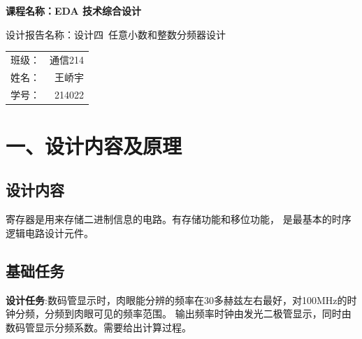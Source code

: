 \documentclass{article}
\newcommand{\fourhao}{\fontsize{14pt}{\baselineskip}\selectfont} %
\newcommand{\xiaosihao}{\fontsize{12pt}{\baselineskip}\selectfont} %
\begin{document}
\begin{titlepage}
    \centering
    \vspace*{2cm}

    \Huge
    \textbf{课程名称：EDA 技术综合设计}

    \vspace{2cm}

    \LARGE
    设计报告名称：设计四\ 任意小数和整数分频器设计

    \vspace{4cm}

    \centering
    \Large
    \begin{tabular}{rl}
        班级： & 通信214    \\
        姓名： & \ 王峤宇   \\
        学号： & \ 214022
    \end{tabular}

    \vfill

    \vspace{1cm}
\end{titlepage}

\newpage
\section*{\fourhao 一、设计内容及原理}
\xiaosihao
{}
\subsection*{设计内容}
寄存器是用来存储二进制信息的电路。有存储功能和移位功能， 是最基本的时序逻辑电路设计元件。
\subsection*{基础任务}
\textbf{设计任务}:数码管显示时，肉眼能分辨的频率在30多赫兹左右最好，对100MHz的时钟分频，分频到肉眼可见的频率范围。
输出频率时钟由发光二极管显示，同时由数码管显示分频系数。需要给出计算过程。\\
\end{document}
